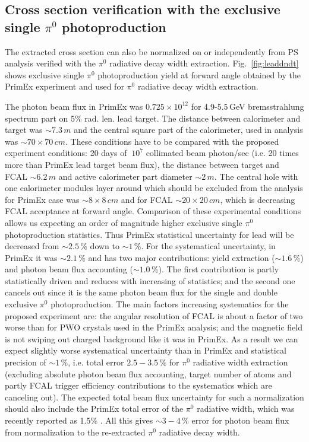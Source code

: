 \subsection{Cross section verification with the exclusive single $\pi^{0}$ photoproduction  \label{sec:pi0norm} }
The extracted cross section can also be normalized on or independently
from PS analysis verified with the $\pi^0$ radiative decay width
extraction.  Fig.~\ref{fig:leaddndt} shows exclusive single $\pi^0$
photoproduction yield at forward angle obtained by the PrimEx
experiment and used for $\pi^0$ radiative decay width extraction.

The photon beam flux in PrimEx was $0.725\times10^{12}$ for
4.9-5.5$\,$GeV bremsstrahlung spectrum part on 5\% rad. len. lead
target. The distance between calorimeter and target was $\sim7.3\,m$
and the central square part of the calorimeter, used in analysis was
$\sim70\times70\,cm$. These conditions have to be compared with the
proposed experiment conditions: 20 days of $~10^7$ collimated beam
photon/sec (i.e. 20 times more than PrimEx lead target beam flux), the
distance between target and FCAL $\sim6.2\,m$ and active calorimeter
part diameter $\sim2\,m$.  The central hole with one calorimeter
modules layer around which should be excluded from the analysis for
PrimEx case was $\sim8\times8\,cm$ and for FCAL $\sim20\times20\,cm$,
which is decreasing FCAL acceptance at forward angle. Comparison of
these experimental conditions allows us expecting an order of
magnitude higher exclusive single $\pi^0$ photoproduction statistics.
Thus PrimEx statistical uncertainty for lead will be decreased from
$\sim2.5\,\%$ down to $\sim1\,\%$.  For the systematical uncertainty,
in PrimEx it was $\sim2.1\,\%$ and has two major contributions: yield
extraction ($\sim1.6\,\%$) and photon beam flux accounting
($\sim1.0\,\%$).  The first contribution is partly statistically
driven and reduces with increasing of statistics; and the second one
cancels out since it is the same photon beam flux for the single and
double exclusive $\pi^0$ photoproduction.  The main factors increasing
systematics for the proposed experiment are: the angular resolution of
FCAL is about a factor of two worse than for PWO crystals used in the
PrimEx analysis;
and the magnetic field is not swiping out charged background like it
was in PrimEx.  As a result we can expect slightly worse systematical
uncertainty than in PrimEx and statistical precision of $\sim1\,\%$,
i.e. total error $2.5-3.5\,\%$ for $\pi^0$ radiative width extraction
(excluding absolute photon beam flux accounting, target number of
atoms and partly FCAL trigger efficiency contributions to the
systematics which are canceling out).  The expected total beam flux
uncertainty for such a normalization should also include the PrimEx
total error of the $\pi^0$ radiative width, which was recently
reported as 1.5\% \cite{Larin:2018}.  All this gives $\sim3-4\,\%$
error for photon beam flux from normalization to the re-extracted $\pi^0$ radiative decay width.

